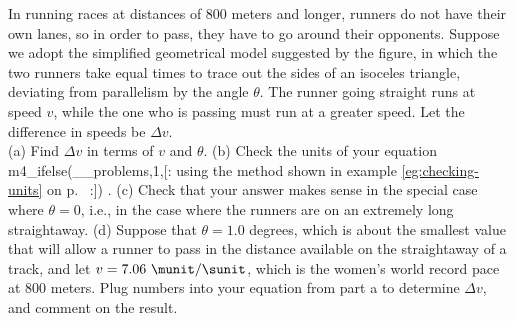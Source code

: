 In running races at distances of 800 meters and longer,
runners do not have their own lanes, so in order to pass,
they have to go around their opponents. Suppose we adopt
the simplified geometrical model suggested by the figure,
in which the two runners take equal times to trace out the 
sides of an isoceles triangle, deviating from parallelism by the
angle $\theta$. The runner going straight runs at speed $v$,
while the one who is passing must run at a greater speed. Let
the difference in speeds be $\Delta v$.\\
(a) Find $\Delta v$ in terms of $v$ and $\theta$.\answercheck\hwendpart
(b) Check the units of your equation 
m4_ifelse(__problems,1,[:%
using the method shown in example \ref{eg:checking-units}
on p.~\pageref{eg:checking-units}%
:])%
.\hwendpart
(c) Check that your answer makes sense in the special case where $\theta=0$, i.e.,
in the case where the runners are on an extremely long straightaway.\hwendpart
(d) Suppose that $\theta=1.0$ degrees, which is about the smallest value
that will allow a runner to pass in the distance available on the straightaway
of a track, and let $v=7.06\ \munit/\sunit$, which is the women's world record pace
at 800 meters.
Plug numbers into your equation from part a to determine $\Delta v$, and
comment on the result.\answercheck\hwendpart
